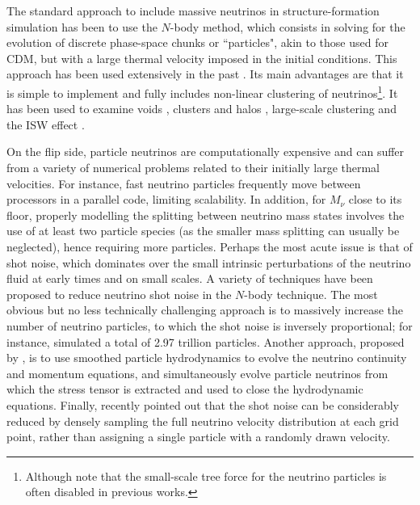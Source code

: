 \documentclass[useAMS, usenatbib]{mnras}
\begin{document}
The standard approach to include massive neutrinos in structure-formation simulation has been to use the $N$-body method, which consists in solving for the evolution of discrete phase-space chunks or ``particles", akin to those used for CDM, but with a %
large thermal velocity imposed in the initial conditions. This approach has been used extensively in the past \cite[e.g.~][]{Brandbyge_2008, Bird_2012, Inman_2017, FVN_2017}. Its main advantages are that it is simple to implement and fully includes non-linear clustering of neutrinos\footnote{Although note that the small-scale tree force for the neutrino particles is often disabled in previous works.}. It has been used to examine voids \citep{Massara_2015}, clusters and halos \citep{FVN_2014, Castorina_2014, Costanzi_2013}, large-scale clustering \citep{Castorina_2015} and the ISW effect \citep{Carbone_2016}.

On the flip side, particle neutrinos are computationally expensive and can suffer from a variety of numerical problems related to their initially large thermal velocities. For instance, fast neutrino particles frequently move between processors in a parallel code, limiting scalability. In addition, for $M_\nu$ close to its floor, properly modelling the splitting between neutrino mass states involves the use of at least two particle species (as the smaller mass splitting can usually be neglected), hence requiring more particles. Perhaps the most acute issue is that of shot noise, which dominates over the small intrinsic perturbations of the neutrino fluid at early times and on small scales. %
A variety of techniques have been proposed to reduce neutrino shot noise in the $N$-body technique. The most obvious but no less technically challenging approach is to massively increase the number of neutrino particles, to which the shot noise is inversely proportional; for instance, \cite{Emberson_17} simulated a total of 2.97 trillion particles. Another approach, proposed by \cite{Banerjee_2016}, is to use smoothed particle hydrodynamics to evolve the neutrino continuity and momentum equations, and simultaneously evolve particle neutrinos from which the stress tensor is extracted and used to close the hydrodynamic equations. Finally, \cite{Banerjee_2018} recently pointed out that the shot noise can be considerably reduced by densely sampling the full neutrino velocity distribution at each grid point, rather than assigning a single particle with a randomly drawn velocity.
\end{document}
